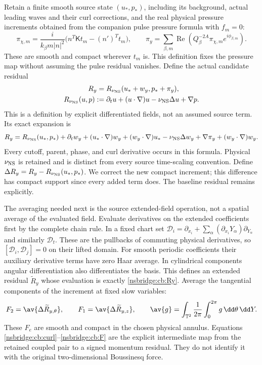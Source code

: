 Retain a finite smooth source state $(u_*,p_*)$, including its background,
actual leading waves and their curl corrections, and the real
physical pressure increments obtained from the companion pulse pressure
formula with $f_m=0$:
\[
 \pi_{\chi,m}=\frac{i}{k_\beta m|n|^2}
                  \bigl(n^T\mathsf Kt_m-(n')^Tt_m\bigr),\qquad
 \pi_y=\sum_{\beta,m}\operatorname{Re}
             (Q_\beta^{-2A}\pi_{\chi,m}e^{i\phi_{\beta,m}}).
\]
These are smooth and compact wherever $t_m$ is. This definition fixes the
pressure map without assuming the pulse residual vanishes.
Define the actual candidate residual
\begin{align}
 R_y={}&R_{\nu_{\rm NS}}(u_*+w_y,p_*+\pi_y), \nonumber\\
 R_{\nu_{\rm NS}}(u,p)
   :={}&\partial_tu+(u\cdot\nabla)u-\nu_{\rm NS}\Delta u+\nabla p .
 \label{nsbridge:cb:Ry}
\end{align}
This is a definition by explicit differentiated fields, not an assumed
source term. Its exact expansion is
\[
 R_y=R_{\nu_{\rm NS}}(u_*,p_*)
 +\partial_tw_y+(u_*\cdot\nabla)w_y+(w_y\cdot\nabla)u_*
 -\nu_{\rm NS}\Delta w_y+\nabla\pi_y
 +(w_y\cdot\nabla)w_y .
\]
Every cutoff, parent, phase, and curl derivative occurs in this formula.
Physical $\nu_{\rm NS}$ is retained and is distinct from every source
time-scaling convention. Define
$\Delta R_y=R_y-R_{\nu_{\rm NS}}(u_*,p_*)$.
We correct the new compact increment; this difference has compact support
since every added term does. The baseline residual remains explicitly.

The averaging needed next is the source extended-field operation, not a
spatial average of the evaluated field. Evaluate derivatives on the
extended coefficients first by the complete chain rule. In a fixed
chart set $\mathcal D_i=\partial_{x_i}
+\sum_\alpha(\partial_{x_i}Y_\alpha)\partial_{Y_\alpha}$ and similarly
$\mathcal D_t$. These are the pullbacks of commuting physical
derivatives, so $[\mathcal D_i,\mathcal D_j]=0$ on their lifted domain.
For smooth periodic coefficients their auxiliary derivative terms have
zero Haar average. In cylindrical components angular differentiation
also differentiates the basis. This defines an extended residual
$\widetilde R_y$ whose evaluation is exactly \eqref{nsbridge:cb:Ry}.
Average the tangential components of the increment at fixed slow variables:
\begin{equation}
 F_2=\av{\Delta\widetilde R_{y,\theta}},\qquad
 F_1=\av{\Delta\widetilde R_{y,z}},\qquad
 \av{g}=\int_{\mathbb T^2}\frac1{2\pi}
                    \int_0^{2\pi}g\,\dd\theta\,\dd Y . \label{nsbridge:cb:F}
\end{equation}
These $F_e$ are smooth and compact
in the chosen physical annulus. Equations \eqref{nsbridge:cb:curl}--\eqref{nsbridge:cb:F}
are the explicit intermediate map from the retained coupled pair to a
signed momentum residual. They do not identify it with the original
two-dimensional Boussinesq force.

